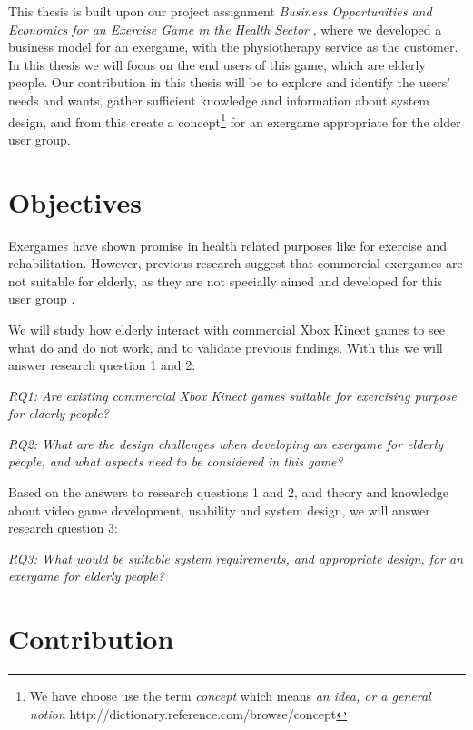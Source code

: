 This thesis is built upon our project assignment \emph{Business Opportunities and Economics for an Exercise Game in the Health Sector} \cite{project}, where we developed a business model for an exergame, with the physiotherapy service as the customer. In this thesis we will focus on the end users of this game, which are elderly people. Our contribution in this thesis will be to explore and identify the users' needs and wants, gather sufficient knowledge and information about system design, and from this create a concept\footnote{We have choose use the term \emph{concept} which means \emph{an idea, or a general notion} http://dictionary.reference.com/browse/concept} for an exergame appropriate for the older user group.

\section{Objectives}
\label{sec:researchq} Exergames have shown promise in health related purposes like for exercise and rehabilitation. However, previous research suggest that commercial exergames are not suitable for elderly, as they are not specially aimed and developed for this user group \cite{exergamesforelderly} \cite{gerling2} \cite{bruin} \cite{project}. 

We will study how elderly interact with commercial Xbox Kinect games to see what do and do not work, and to validate previous findings. With this we will answer research question 1 and 2: 

\emph{RQ1: Are existing commercial Xbox Kinect games suitable for exercising purpose for elderly people?} 

\emph{RQ2: What are the design challenges when developing an exergame for elderly people, and what aspects need to be considered in this game?}

Based on the answers to research questions 1 and 2, and theory and knowledge about video game development, usability and system design, we will answer research question 3:

\emph{RQ3: What would be suitable system requirements, and appropriate design, for an exergame for elderly people?}

\section{Contribution}

